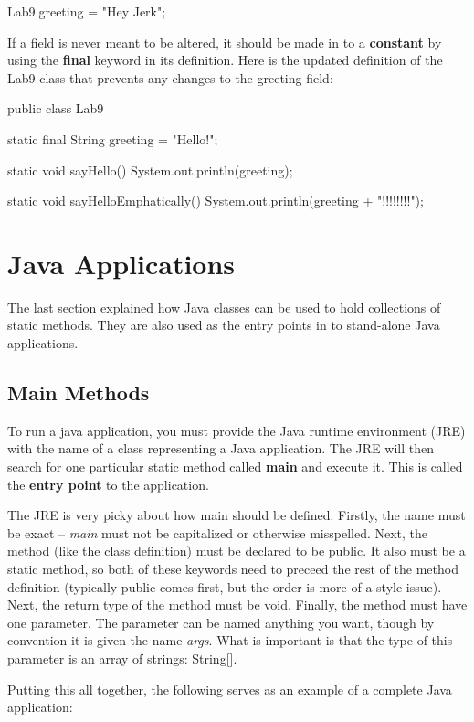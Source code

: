 \begin{code}
Lab9.greeting = "Hey Jerk";
\end{code}

If a field is never meant to be altered, it should be made in to a \textbf{constant} by using the \textbf{final} keyword in its definition. Here is the updated definition of the Lab9 class that prevents any changes to the greeting field:


\begin{code}
public class Lab9 {
  static final String greeting = "Hello!";

  static void sayHello() {
    System.out.println(greeting);
  }

  static void sayHelloEmphatically() {
    System.out.println(greeting + "!!!!!!!!");
  }
}
\end{code}

\section{Java Applications}
The last section explained how Java classes can be used to hold collections of static methods. They are also used as the entry points in to stand-alone Java applications. 

\subsection{Main Methods}
To run a java application, you must provide the Java runtime environment (JRE) with the name of a class representing a Java application. The JRE will then search for one particular static method called \textbf{main} and execute it. This is called the \textbf{entry point} to the application. 

The JRE is very picky about how main should be defined. Firstly, the name must be exact -- \textit{main} must not be capitalized or otherwise misspelled. Next, the method (like the class definition) must be declared to be public. It also must be a static method, so both of these keywords need to preceed the rest of the method definition (typically public comes first, but the order is more of a style issue). Next, the return type of the method must be void. Finally, the method must have one parameter. The parameter can be named anything you want, though by convention it is given the name \textit{args}. What is important is that the type of this parameter is an array of strings:  String[].  

Putting this all together, the following serves as an example of a complete Java application:

